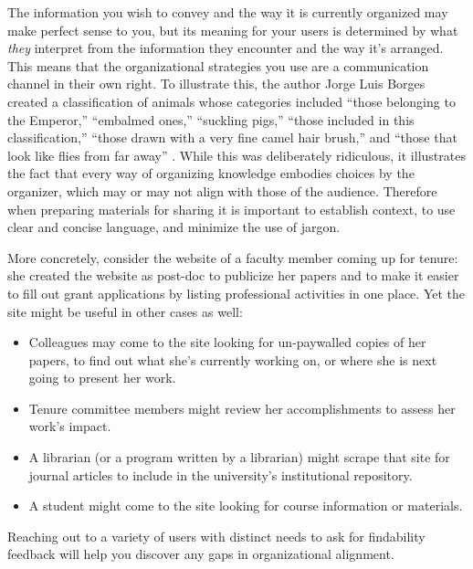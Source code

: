 \documentclass[10pt,letterpaper]{article}
\begin{document}
The information you wish to convey and the way it is currently organized may
make perfect sense to you, but its meaning for your users is determined by what
\emph{they} interpret from the information they encounter and the way it's
arranged. This means that the organizational strategies you use are a
communication channel in their own right. To illustrate this, the author Jorge
Luis Borges created a classification of animals whose categories included
``those belonging to the Emperor,'' ``embalmed ones,'' ``suckling pigs,''
``those included in this classification,'' ``those drawn with a very fine camel
hair brush,'' and ``those that look like flies from far away'' \cite{Borges2000}.
While this was deliberately ridiculous, it illustrates the fact that every way
of organizing knowledge embodies choices by the organizer, which may or may not
align with those of the audience. Therefore when preparing materials for sharing
it is important to establish context, to use clear and concise language, and
minimize the use of jargon.

More concretely, consider the website of a faculty member coming up for tenure:
she created the website as post-doc to publicize her papers and to make it
easier to fill out grant applications by listing professional activities in one
place. Yet the site might be useful in other cases as well:

\begin{itemize}

\item
  Colleagues may come to the site looking for un-paywalled copies of her papers,
  to find out what she's currently working on, or where she is next going to
  present her work.

\item
  Tenure committee members might review her accomplishments to assess her
  work's impact.

\item
  A librarian (or a program written by a librarian) might scrape that site for
  journal articles to include in the university's institutional repository.

\item
  A student might come to the site looking for course information or materials.

\end{itemize}

Reaching out to a variety of users with distinct needs to ask for findability
feedback will help you discover any gaps in organizational alignment.
\end{document}

